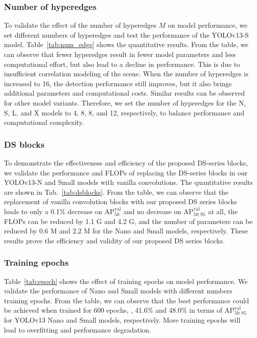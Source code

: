 \subsubsection{Number of hyperedges} To validate the effect of the number of hyperedges $M$ on model performance, we set different numbers of hyperedges and test the performance of the YOLOv13-S model. Table~\ref{tab:num_edge} shows the quantitative results. From the table, we can observe that fewer hyperedges result in fewer model parameters and less computational effort, but also lead to a decline in performance. This is due to insufficient correlation modeling of the scene. When the number of hyperedges is increased to 16, the detection performance still improves, but it also brings additional parameters and computational costs. Similar results can be observed for other model variants. Therefore, we set the number of hyperedges for the N, S, L, and X models to 4, 8, 8, and 12, respectively, to balance performance and computational complexity.

\subsubsection{DS blocks} To demonstrate the effectiveness and efficiency of the proposed DS-series blocks, we validate the performance and FLOPs of replacing the DS-series blocks in our YOLOv13-N and Small models with vanilla convolutions. The quantitative results are shown in Tab.~\ref{tab:dsblocks}. From the table, we can observe that the replacement of vanilla convolution blocks with our proposed DS series blocks leads to only a 0.1\% decrease on  $\text{AP}_{50}^\text{val}$ and no decrease on $\text{AP}_{50:95}^\text{val}$ at all, the FLOPs can be reduced by 1.1 G and 4.2 G, and the number of parameters can be reduced by 0.6 M and 2.2 M for the Nano and Small models, respectively. These results prove the efficiency and validity of our proposed DS series blocks.

\subsubsection{Training epochs} Table~\ref{tab:epoch} shows the effect of training epochs on model performance. We validate the performance of Nano and Small models with different numbers training epochs. From the table, we can observe that the best performance could be achieved when trained for 600 epochs, \ie, 41.6\% and 48.0\% in terms of $\text{AP}_{50:95}^\text{val}$ for YOLOv13 Nano and Small models, respectively. More training epochs will lead to overfitting and performance degradation.

